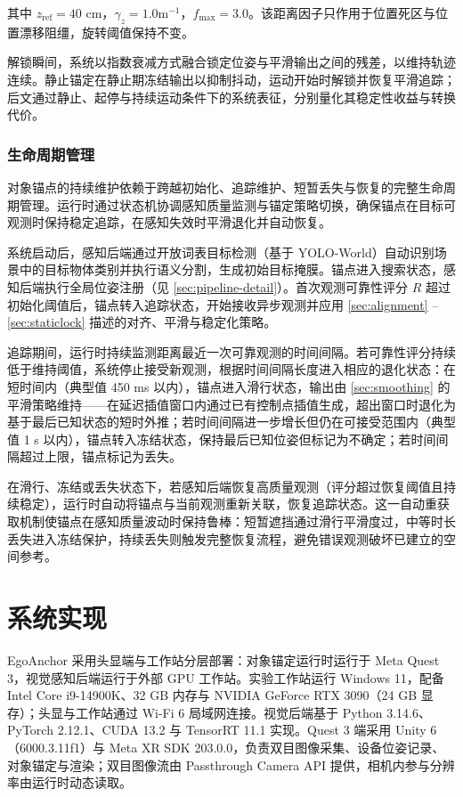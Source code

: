 \documentclass[review]{vgtc}
\begin{document}
其中 $z_{\mathrm{ref}} = 40$ cm，$\gamma_z = 1.0 \mathrm{m}^{-1}$，$f_{\mathrm{max}} = 3.0$。该距离因子只作用于位置死区与位置漂移阻缰，旋转阈值保持不变。

解锁瞬间，系统以指数衰减方式融合锁定位姿与平滑输出之间的残差，以维持轨迹连续。静止锚定在静止期冻结输出以抑制抖动，运动开始时解锁并恢复平滑追踪；后文通过静止、起停与持续运动条件下的系统表征，分别量化其稳定性收益与转换代价。

\subsubsection{生命周期管理}\label{sec:lifecycle}


对象锚点的持续维护依赖于跨越初始化、追踪维护、短暂丢失与恢复的完整生命周期管理。运行时通过状态机协调感知质量监测与锚定策略切换，确保锚点在目标可观测时保持稳定追踪，在感知失效时平滑退化并自动恢复。

系统启动后，感知后端通过开放词表目标检测（基于 YOLO-World）自动识别场景中的目标物体类别并执行语义分割，生成初始目标掩膜。锚点进入搜索状态，感知后端执行全局位姿注册（见 \ref{sec:pipeline-detail}）。首次观测可靠性评分 $R$ 超过初始化阈值后，锚点转入追踪状态，开始接收异步观测并应用 \ref{sec:alignment} -- \ref{sec:staticlock} 描述的对齐、平滑与稳定化策略。

追踪期间，运行时持续监测距离最近一次可靠观测的时间间隔。若可靠性评分持续低于维持阈值，系统停止接受新观测，根据时间间隔长度进入相应的退化状态：在短时间内（典型值 450 ms 以内），锚点进入滑行状态，输出由 \ref{sec:smoothing} 的平滑策略维持------在延迟插值窗口内通过已有控制点插值生成，超出窗口时退化为基于最后已知状态的短时外推；若时间间隔进一步增长但仍在可接受范围内（典型值 1 s 以内），锚点转入冻结状态，保持最后已知位姿但标记为不确定；若时间间隔超过上限，锚点标记为丢失。

在滑行、冻结或丢失状态下，若感知后端恢复高质量观测（评分超过恢复阈值且持续稳定），运行时自动将锚点与当前观测重新关联，恢复追踪状态。这一自动重获取机制使锚点在感知质量波动时保持鲁棒：短暂遮挡通过滑行平滑度过，中等时长丢失进入冻结保护，持续丢失则触发完整恢复流程，避免错误观测破坏已建立的空间参考。

\section{系统实现}\label{sec:impl}


EgoAnchor 采用头显端与工作站分层部署：对象锚定运行时运行于 Meta Quest 3，视觉感知后端运行于外部 GPU 工作站。实验工作站运行 Windows 11，配备 Intel Core i9-14900K、32 GB 内存与 NVIDIA GeForce RTX 3090（24 GB 显存）；头显与工作站通过 Wi-Fi 6 局域网连接。视觉后端基于 Python 3.14.6、PyTorch 2.12.1、CUDA 13.2 与 TensorRT 11.1 实现。Quest 3 端采用 Unity 6（6000.3.11f1）与 Meta XR SDK 203.0.0，负责双目图像采集、设备位姿记录、对象锚定与渲染；双目图像流由 Passthrough Camera API 提供，相机内参与分辨率由运行时动态读取。
\end{document}
